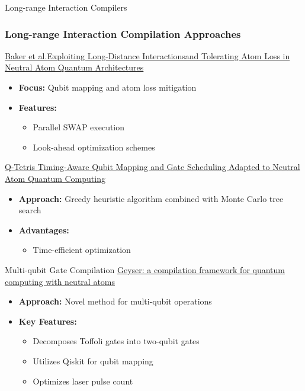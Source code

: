 \begin{frame}{Long-range Interaction Compilers}
    \frametitle{Long-range Interaction Compilation Approaches}
    \href{https://arxiv.org/pdf/2111.06469}{Baker et al.\tiny{Exploiting Long-Distance Interactionsand Tolerating Atom Loss in Neutral Atom Quantum Architectures}}
    \begin{itemize}
        \item \textbf{Focus:} Qubit mapping and atom loss mitigation
        \item \textbf{Features:}
            \begin{itemize}
                \item Parallel SWAP execution
                \item Look-ahead optimization schemes
            \end{itemize}
    \end{itemize}
    
    \vspace{0.5em}
    \href{https://ieeexplore.ieee.org/abstract/document/10082942/}{Q-Tetris \tiny{Timing-Aware Qubit Mapping and Gate Scheduling Adapted to Neutral Atom Quantum Computing}}
    \begin{itemize}
        \item \textbf{Approach:} Greedy heuristic algorithm combined with Monte Carlo tree search
        \item \textbf{Advantages:}
            \begin{itemize}
                \item Time-efficient optimization
            \end{itemize}
    \end{itemize}
\end{frame}

\begin{frame}{Multi-qubit Gate Compilation}
    \href{https://dl.acm.org/doi/10.1145/3470496.3527428}{Geyser: a compilation framework for quantum computing with neutral atoms}
    \begin{itemize}
        \item \textbf{Approach:} Novel method for multi-qubit operations
        \item \textbf{Key Features:}
            \begin{itemize}
                \item Decomposes Toffoli gates into two-qubit gates
                \item Utilizes Qiskit for qubit mapping
                \item Optimizes laser pulse count
            \end{itemize}
    \end{itemize}
\end{frame}

